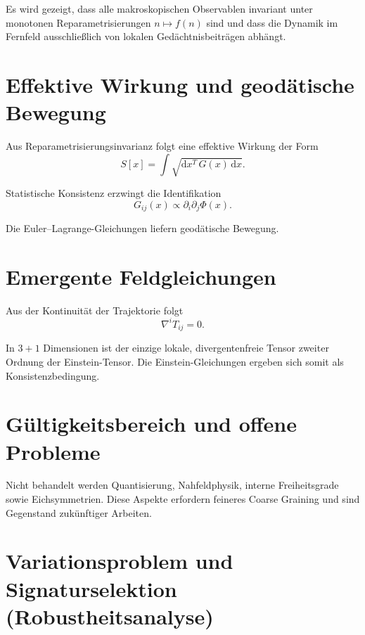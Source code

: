 \documentclass[11pt,a4paper]{article}
\renewcommand{\dd}{\mathrm{d}}
\begin{document}
Es wird gezeigt, dass alle makroskopischen Observablen invariant unter monotonen Reparametrisierungen $n \mapsto f(n)$ sind und dass die Dynamik im Fernfeld ausschließlich von lokalen Gedächtnisbeiträgen abhängt.

\section{Effektive Wirkung und geod\"atische Bewegung}

Aus Reparametrisierungsinvarianz folgt eine effektive Wirkung der Form
\begin{equation}
 S[x] = \int \sqrt{\dd x^T \, G(x) \, \dd x}.
\end{equation}

Statistische Konsistenz erzwingt die Identifikation
\begin{equation}
 G_{ij}(x) \propto \partial_i \partial_j \Phi(x).
\end{equation}

Die Euler--Lagrange-Gleichungen liefern geodätische Bewegung.

\section{Emergente Feldgleichungen}

Aus der Kontinuität der Trajektorie folgt
\begin{equation}
 \nabla^i T_{ij} = 0.
\end{equation}

In $3+1$ Dimensionen ist der einzige lokale, divergentenfreie Tensor zweiter Ordnung der Einstein-Tensor. Die Einstein-Gleichungen ergeben sich somit als Konsistenzbedingung.

\section{G\"ultigkeitsbereich und offene Probleme}

Nicht behandelt werden Quantisierung, Nahfeldphysik, interne Freiheitsgrade sowie Eichsymmetrien. Diese Aspekte erfordern feineres Coarse Graining und sind Gegenstand zukünftiger Arbeiten.

\appendix

\section{Variationsproblem und Signaturselektion (Robustheitsanalyse)}
\end{document}
